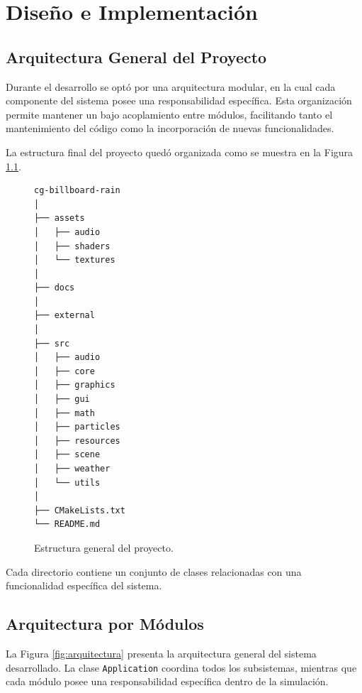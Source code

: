 \chapter{Diseño e Implementación}

\section{Arquitectura General del Proyecto}

Durante el desarrollo se optó por una arquitectura modular, en la cual cada componente del sistema posee una responsabilidad específica. Esta organización permite mantener un bajo acoplamiento entre módulos, facilitando tanto el mantenimiento del código como la incorporación de nuevas funcionalidades.

La estructura final del proyecto quedó organizada como se muestra en la Figura \ref{fig:estructura}.

\begin{figure}[H]
\centering
\begin{verbatim}
cg-billboard-rain
│
├── assets
│   ├── audio
│   ├── shaders
│   └── textures
│
├── docs
│
├── external
│
├── src
│   ├── audio
│   ├── core
│   ├── graphics
│   ├── gui
│   ├── math
│   ├── particles
│   ├── resources
│   ├── scene
│   ├── weather
│   └── utils
│
├── CMakeLists.txt
└── README.md
\end{verbatim}
\caption{Estructura general del proyecto.}
\label{fig:estructura}
\end{figure}

Cada directorio contiene un conjunto de clases relacionadas con una funcionalidad específica del sistema.

\section{Arquitectura por Módulos}

La Figura \ref{fig:arquitectura} presenta la arquitectura general del sistema desarrollado. La clase \texttt{Application} coordina todos los subsistemas, mientras que cada módulo posee una responsabilidad específica dentro de la simulación.

